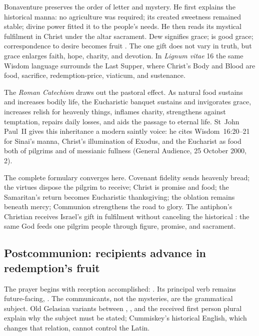 Bonaventure preserves the order of letter and mystery. He first explains the
historical manna: no agriculture was required; its created sweetness remained
stable; divine power fitted it to the people's needs. He then reads its mystical
fulfilment in Christ under the altar sacrament. Dew signifies grace;
 is good grace; correspondence to desire becomes fruit
. The one gift does not vary in
truth, but grace enlarges faith, hope, charity, and devotion. In \emph{Lignum
vitae} 16 the same Wisdom language surrounds the Last Supper, where Christ's
Body and Blood are food, sacrifice, redemption-price, viaticum, and sustenance.

The \emph{Roman Catechism} draws out the pastoral effect. As natural food
sustains and increases bodily life, the Eucharistic banquet sustains and
invigorates grace, increases relish for heavenly things, inflames charity,
strengthens against temptation, repairs daily losses, and aids the passage to
eternal life. St~John Paul~II gives this inheritance a modern saintly voice:
he cites Wisdom~16:20--21 for Sinai's manna, Christ's illumination of Exodus,
and the Eucharist as food both of pilgrims and of messianic fullness (General
Audience, 25 October 2000, 2).

The complete formulary converges here. Covenant fidelity sends heavenly bread;
the virtues dispose the pilgrim to receive; Christ is promise and food; the
Samaritan's return becomes Eucharistic thanksgiving; the oblation remains
beneath mercy; Communion strengthens the road to glory. The antiphon's
Christian  receives Israel's gift in fulfilment without canceling
the historical : the same God feeds one pilgrim people through
figure, promise, and sacrament.

\subsection*{Postcommunion: recipients advance in redemption's fruit\enspace{}}

The prayer begins with reception accomplished: . Its principal verb remains future-facing, .
The communicants, not the mysteries, are the grammatical subject. Old Gelasian
variants between , , and the received first
person plural explain why the subject must be stated; Cummiskey's historical
English, which changes that relation, cannot control the Latin.


